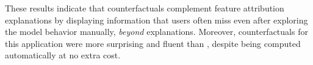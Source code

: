 These results indicate that \sysname{} counterfactuals complement feature attribution explanations by displaying information that users often miss even after exploring the model behavior manually, \emph{beyond} explanations. Moreover, \sysname{} counterfactuals for this application were more surprising and fluent than \chuman, despite being computed automatically at no extra cost.






